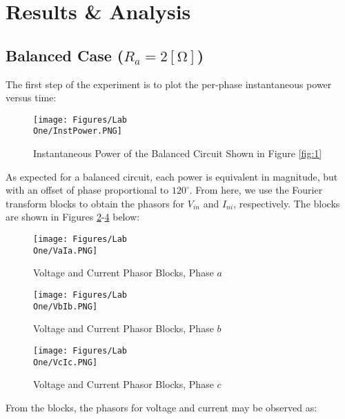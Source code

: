 \documentclass[
	letterpaper, %
	10pt, %
]{CSUniSchoolLabReport}
\begin{document}
\section{Results \& Analysis} 

\subsection{Balanced Case ($R_a=2[\si{\ohm}]$)}

The first step of the experiment is to plot the per-phase instantaneous power versus time:

  \begin{figure}[H]
    \centering
    \texttt{[image: Figures/Lab\\ One/InstPower.PNG]}
    \caption{Instantaneous Power of the Balanced Circuit Shown in Figure \ref{fig:1}}
    \label{fig:2}
  \end{figure}

  As expected for a balanced circuit, each power is equivalent in magnitude, but with an offset of phase proportional to $120^{\circ}$. From here, we use the Fourier transform blocks to obtain the phasors for $V_{in}$ and $I_{ni}$, respectively. The blocks are shown in Figures \ref{fig:3}-\ref{fig:5} below:

  \begin{multicols}{3}

    \begin{figure}[H]
      \centering
      \texttt{[image: Figures/Lab\\ One/VaIa.PNG]}
      \caption{Voltage and Current Phasor Blocks, Phase $a$}
      \label{fig:3}
    \end{figure}

    \begin{figure}[H]
      \centering
      \texttt{[image: Figures/Lab\\ One/VbIb.PNG]}
      \caption{Voltage and Current Phasor Blocks, Phase $b$}
      \label{fig:4}
    \end{figure}

    \begin{figure}[H]
      \centering
      \texttt{[image: Figures/Lab\\ One/VcIc.PNG]}
      \caption{Voltage and Current Phasor Blocks, Phase $c$}
      \label{fig:5}
    \end{figure}
  \end{multicols}

  From the blocks, the phasors for voltage and current may be observed as:
\end{document}
